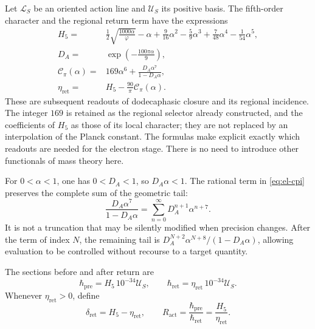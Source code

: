Let \(\mathcal L_S\) be an oriented action line and \(\mathcal U_S\)
its positive basis. The fifth-order character and the regional return
term have the expressions
\begin{align}
 H_5={}&\frac12\sqrt{\frac{1000\alpha}{\varphi}}-\alpha
   +\frac9{16}\alpha^2-\frac59\alpha^3
   +\frac7{48}\alpha^4-\frac1{54}\alpha^5,
   \label{eq:el-h5}\\
 D_A={}&\exp\!\left(-\frac{100\pi\alpha}{9}\right),
   \label{eq:el-da}\\
 \mathcal C_\pi(\alpha)={}&169\alpha^6+
       \frac{D_A\alpha^7}{1-D_A\alpha},
   \label{eq:el-cpi}\\
 \eta_{\mathrm{ret}}={}&H_5-\frac{90}{\pi}\mathcal C_\pi(\alpha).
   \label{eq:el-eta}
\end{align}
These are subsequent readouts of dodecaphasic closure and its
regional incidence. The integer \(169\) is retained as the regional
selector already constructed, and the coefficients of \(H_5\) as those of its
local character; they are not replaced by an interpolation of the Planck
constant. The formulas make explicit exactly which readouts are needed
for the electron stage. There is no need to introduce other
functionals of mass theory here.

For \(0<\alpha<1\), one has \(0<D_A<1\), so
\(D_A\alpha<1\). The rational term in \eqref{eq:el-cpi} preserves the
complete sum of the geometric tail:
\begin{equation}
 \frac{D_A\alpha^7}{1-D_A\alpha}
 =\sum_{n=0}^{\infty}D_A^{n+1}\alpha^{n+7}.
 \label{eq:el-cola-regional}
\end{equation}
It is not a truncation that may be silently modified when precision
changes. After the term of index \(N\), the remaining tail is
\(D_A^{N+2}\alpha^{N+8}/(1-D_A\alpha)\), allowing evaluation to
be controlled without recourse to a target quantity.

\begin{definition}
The sections before and after return are
\begin{equation}
 \hbar_{\mathrm{pre}}=H_5\,10^{-34}\mathcal U_S,
 \qquad
 \hbar_{\mathrm{ret}}=\eta_{\mathrm{ret}}\,10^{-34}\mathcal U_S.
 \label{eq:el-secciones-accion}
\end{equation}
Whenever \(\eta_{\mathrm{ret}}>0\), define
\begin{equation}
 \delta_{\mathrm{ret}}=H_5-\eta_{\mathrm{ret}},\qquad
 R_{\mathrm{act}}=\frac{\hbar_{\mathrm{pre}}}{\hbar_{\mathrm{ret}}}
 =\frac{H_5}{\eta_{\mathrm{ret}}}.
 \label{eq:el-ratio}
\end{equation}
\end{definition}

